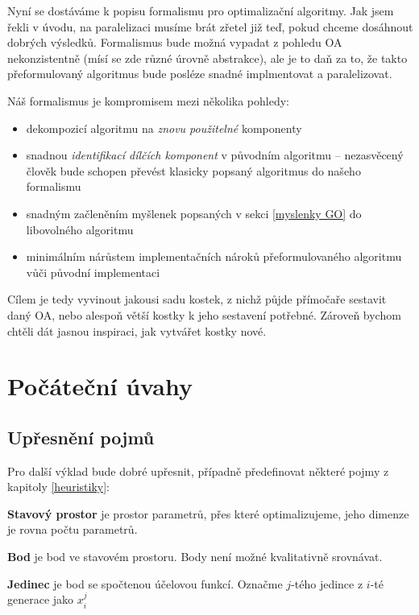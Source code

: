 
Nyní se dostáváme k popisu formalismu pro optimalizační algoritmy. Jak jsem řekli v úvodu, na paralelizaci musíme brát zřetel již teď, pokud chceme dosáhnout dobrých výsledků. Formalismus bude možná vypadat z pohledu OA nekonzistentně (mísí se zde různé úrovně abstrakce), ale je to daň za to, že takto přeformulovaný algoritmus bude posléze snadné implmentovat a paralelizovat.

Náš formalismus je kompromisem mezi několika pohledy: 
\begin{itemize}
  \item dekompozicí algoritmu na \emph{znovu použitelné} komponenty
  \item snadnou \emph{identifikací dílčích komponent} v původním algoritmu -- nezasvěcený člověk bude schopen převést klasicky popsaný algoritmus do našeho formalismu
  \item snadným začleněním myšlenek popsaných v sekci \ref{myslenky GO} do libovolného algoritmu
  \item minimálním nárůstem implementačních nároků přeformulovaného algoritmu vůči původní implementaci
\end{itemize}

Cílem je tedy vyvinout jakousi sadu kostek, z nichž půjde přímočaře sestavit daný OA, nebo alespoň větší kostky k jeho sestavení potřebné. Zároveň bychom chtěli dát jasnou inspiraci, jak vytvářet kostky nové.

\section{Počáteční úvahy}
\subsection{Upřesnění pojmů}
Pro další výklad bude dobré upřesnit, případně předefinovat některé pojmy z kapitoly \ref{heuristiky}:

\par{\textbf{Stavový prostor} je prostor parametrů, přes které optimalizujeme, jeho dimenze je rovna počtu parametrů.}

\par{\textbf{Bod} je bod ve stavovém prostoru. Body není možné kvalitativně srovnávat.}

\par{\textbf{Jedinec} je bod se spočtenou účelovou funkcí. Označme $j$-tého jedince z $i$-té generace jako $x^j_i$}

